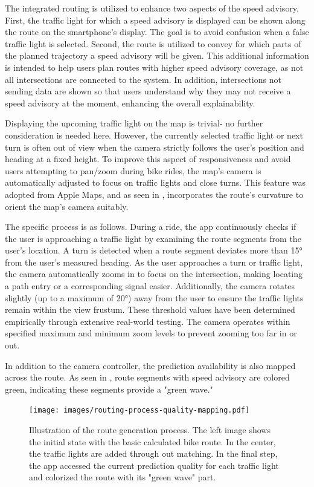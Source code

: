 The integrated routing is utilized to enhance two aspects of the speed advisory. First, the traffic light for which a speed advisory is displayed can be shown along the route on the smartphone's display. The goal is to avoid confusion when a false traffic light is selected. Second, the route is utilized to convey for which parts of the planned trajectory a speed advisory will be given. This additional information is intended to help users plan routes with higher speed advisory coverage, as not all intersections are connected to the system. In addition, intersections not sending data are shown so that users understand why they may not receive a speed advisory at the moment, enhancing the overall explainability.

Displaying the upcoming traffic light on the map is trivial- no further consideration is needed here. However, the currently selected traffic light or next turn is often out of view when the camera strictly follows the user's position and heading at a fixed height. To improve this aspect of responsiveness and avoid users attempting to pan/zoom during bike rides, the map's camera is automatically adjusted to focus on traffic lights and close turns. This feature was adopted from Apple Maps, and as seen in , incorporates the route's curvature to orient the map's camera suitably.

The specific process is as follows. During a ride, the app continuously checks if the user is approaching a traffic light by examining the route segments from the user's location. A turn is detected when a route segment deviates more than 15° from the user's measured heading. As the user approaches a turn or traffic light, the camera automatically zooms in to focus on the intersection, making locating a path entry or a corresponding signal easier. Additionally, the camera rotates slightly (up to a maximum of 20°) away from the user to ensure the traffic lights remain within the view frustum. These threshold values have been determined empirically through extensive real-world testing. The camera operates within specified maximum and minimum zoom levels to prevent zooming too far in or out.

In addition to the camera controller, the prediction availability is also mapped across the route. As seen in , route segments with speed advisory are colored green, indicating these segments provide a "green wave." 

\begin{figure}[t]
\centering
\texttt{[image: images/routing-process-quality-mapping.pdf]}
\caption{Illustration of the route generation process. The left image shows the initial state with the basic calculated bike route. In the center, the traffic lights are added through out matching. In the final step, the app accessed the current prediction quality for each traffic light and colorized the route with its "green wave" part.}
\label{fig:routing-process-quality-mapping}
\end{figure}

